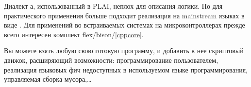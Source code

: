 \secdown

Диалект \lisp а, использованный в PLAI, неплох для описания логики. Но для
практического применения больше подходит реализация на mainstream языках в виде
.
Для применений во встраиваемых системах на микроконтроллерах прежде всего
интересен комплект flex/bison/\cpp \ref{cppcore}.

Вы можете взять любую свою готовую программу, и добавить в нее скриптовый
движок, расширяющий возможности: программирование пользователем, реализация
языковых фич недоступных в используемом языке программирования, управляемая
сборка мусора,\ldots


% 

% 
% 
\secup
